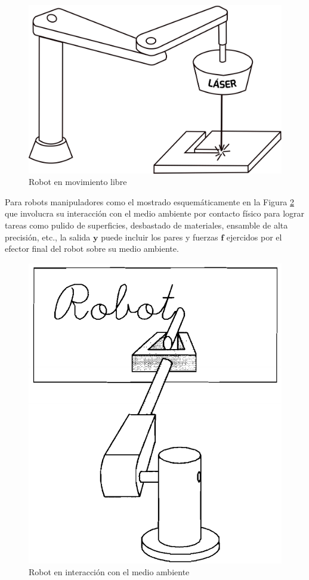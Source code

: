 \begin{figure}[h!]
	\centering
	\includegraphics[scale=0.4]{Capitulo3/figs/robotLaser.png} 
	\caption{Robot en movimiento libre}
	\label{laser}
\end{figure}

Para robots manipuladores como el mostrado esquemáticamente en la Figura \ref{gis} que involucra su interacción con el medio ambiente por contacto físico para lograr tareas como pulido de superficies, desbastado de materiales, ensamble de alta precisión, etc., la salida $\textbf{y}$ puede incluir los pares y fuerzas $\textbf{f}$ ejercidos por el efector final del robot sobre su medio ambiente.

\begin{figure}[h!]
	\centering
	\includegraphics[scale=0.4]{Capitulo3/figs/robotGis.png} 
	\caption{Robot en interacción con el medio ambiente}
	\label{gis}
\end{figure}


